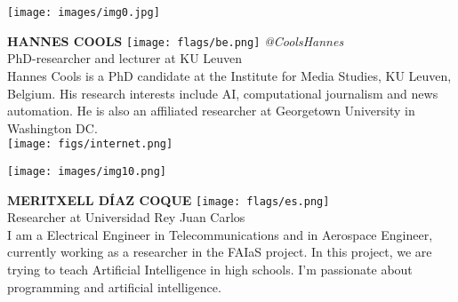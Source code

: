 \noindent
\begin{minipage}{0.3\textwidth}
\centering
\texttt{[image: images/img0.jpg]}
\end{minipage}
\hfill
\begin{minipage}{0.6\textwidth}\raggedright
\color{color1}\uppercase{\textbf{Hannes Cools}}
\color{color2}\hspace{0.2cm}\texttt{[image: flags/be.png]}
\hspace{0.2cm}\textit{@CoolsHannes}
\\
PhD-researcher and lecturer at KU Leuven\\
{\footnotesize 
Hannes Cools is a PhD candidate at the Institute for Media Studies, KU Leuven, Belgium. His research interests include AI, computational journalism and news automation. He is also an affiliated researcher at Georgetown University in Washington DC. }\\
\texttt{[image: figs/internet.png]}
\end{minipage}
\newline\newline\newline

\noindent
\begin{minipage}{0.3\textwidth}
\centering
\texttt{[image: images/img10.png]}
\end{minipage}
\hfill
\begin{minipage}{0.6\textwidth}\raggedright
\color{color1}\uppercase{\textbf{Meritxell Díaz Coque}}
\color{color2}\hspace{0.2cm}\texttt{[image: flags/es.png]}
\\
Researcher at Universidad Rey Juan Carlos\\
{\footnotesize I am a Electrical Engineer in Telecommunications and in Aerospace Engineer, currently working as a researcher in the FAIaS project. In this project, we are trying to teach Artificial Intelligence in high schools. I'm passionate about programming and artificial intelligence.}\\
\end{minipage}
\newline\newline\newline

